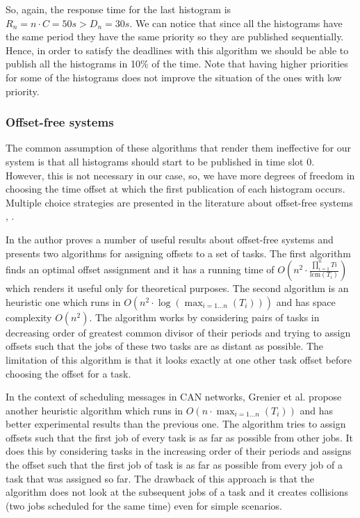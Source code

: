 So, again, the response time for the last histogram is $R_n=n\cdot C=50s > D_n=30s$. We can notice that since all the histograms have the same period they have the same priority so they are published sequentially. Hence, in order to satisfy the deadlines with this algorithm we should be able to publish all the histograms in 10\% of the time. Note that having higher priorities for some of the histograms does not improve the situation of the ones with low priority.

\subsubsection*{Offset-free systems} 

The common assumption of these algorithms that render them ineffective for our system is that all histograms should start to be published in time slot 0. However, this is not necessary in our case, so, we have more degrees of freedom in choosing the time offset at which the first publication of each histogram occurs. Multiple choice strategies are presented in the literature about offset-free systems \citep{goossens2003scheduling}, \citep{grenier2008pushing}.
 
In \citep{goossens2003scheduling} the author proves a number of useful results about offset-free systems and presents two algorithms for assigning offsets to a set of tasks. The first algorithm finds an optimal offset assignment and it has a running time of $O(n^2 \cdot \frac{\prod_{i=1}^n Ti}{\text{lcm}(T_i)})$ which renders it useful only for theoretical purposes. The second algorithm is an heuristic one which runs in $O(n^2\cdot \log(\max_{i=1\ldots n}(T_i)))$ and has space complexity $O(n^2)$. The algorithm works by considering pairs of tasks in decreasing order of greatest common divisor of their periods and trying to assign offsets such that the jobs of these two tasks are as distant as possible. The limitation of this algorithm is that it looks exactly at one other task offset before choosing the offset for a task.

In the context of scheduling messages in CAN networks, Grenier et al. \citep{grenier2008pushing} propose another heuristic algorithm which runs in $O(n\cdot \max_{i=1 \ldots n}(T_i))$ and has better experimental results than the previous one. The algorithm tries to assign offsets such that the first job of every task is as far as possible from other jobs. It does this by considering tasks in the increasing order of their periods and assigns the offset such that the first job of task is as far as possible from every job of a task that was assigned so far. The drawback of this approach is that the algorithm does not look at the subsequent jobs of a task and it creates collisions (two jobs scheduled for the same time) even for simple scenarios.

